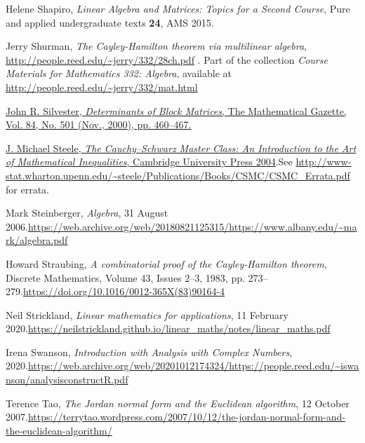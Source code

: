 \documentclass[numbers=enddot,12pt,final,onecolumn,notitlepage]{scrartcl}%
\numberwithin{exer}{subsection}
\theoremstyle{definition}
\begin{document}
\begin{thebibliography}{99999999}
Helene Shapiro, \textit{Linear Algebra and
Matrices: Topics for a Second Course}, Pure and applied undergraduate texts
\textbf{24}, AMS 2015.

Jerry Shurman, \textit{The Cayley-Hamilton theorem
via multilinear algebra}, \url{http://people.reed.edu/~jerry/332/28ch.pdf} .
Part of the collection \textit{Course Materials for Mathematics 332: Algebra},
available at \url{http://people.reed.edu/~jerry/332/mat.html}

%
\href{https://web.archive.org/web/20140505161153/http://www.mth.kcl.ac.uk/~jrs/gazette/blocks.pdf}{John
R. Silvester, \textit{Determinants of Block Matrices}, The Mathematical
Gazette, Vol. 84, No. 501 (Nov., 2000), pp. 460--467.}

%
\href{http://www.ma.huji.ac.il/~ehudf/courses/Ineq09/The Cauchy-Schwarz Master Class .pdf}{J.
Michael Steele, \textit{The Cauchy--Schwarz Master Class: An Introduction to
the Art of Mathematical Inequalities}, Cambridge University Press
2004}.\newline See
\url{http://www-stat.wharton.upenn.edu/~steele/Publications/Books/CSMC/CSMC_Errata.pdf}
for errata.

Mark Steinberger, \textit{Algebra}, 31 August
2006.\newline\url{https://web.archive.org/web/20180821125315/https://www.albany.edu/~mark/algebra.pdf}

Howard Straubing, \textit{A combinatorial proof of
the Cayley-Hamilton theorem}, Discrete Mathematics, Volume 43, Issues 2--3,
1983, pp. 273--279.\newline\url{https://doi.org/10.1016/0012-365X(83)90164-4}

Neil Strickland, \textit{Linear mathematics for
applications}, 11 February 2020.\newline\url{https://neilstrickland.github.io/linear_maths/notes/linear_maths.pdf}

Irena Swanson, \textit{Introduction with Analysis
with Complex Numbers}, 2020.\newline\url{https://web.archive.org/web/20201012174324/https://people.reed.edu/~iswanson/analysisconstructR.pdf}

Terence Tao, \textit{The Jordan normal form and the
Euclidean algorithm}, 12 October 2007.\newline\url{https://terrytao.wordpress.com/2007/10/12/the-jordan-normal-form-and-the-euclidean-algorithm/}


\end{thebibliography}
\end{document}
